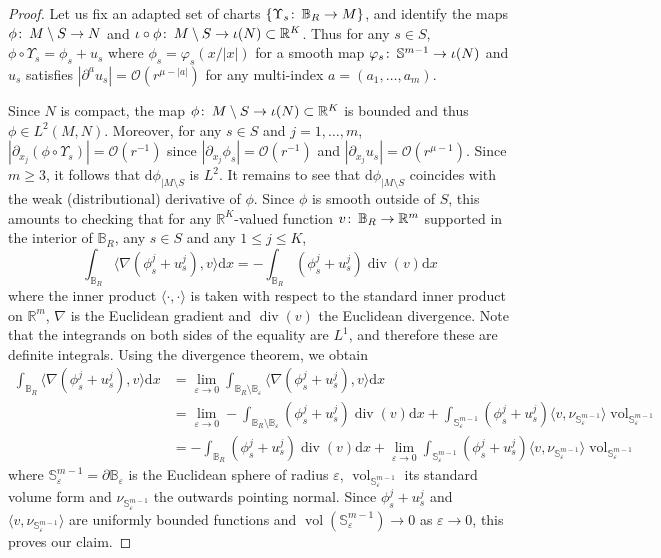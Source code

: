 \documentclass{article}
\numberwithin{equation}{section}        %
\theoremstyle{bfnote}
\theoremstyle{definition}
\theoremstyle{bfremark}
\newcommand{\col}{\colon \thinspace}        %
\newcommand{\R}{\mathbb{R}}                 %
\newcommand{\Ball}{\mathbb{B}}              %
\newcommand{\Sp}{\mathbb{S}}                %
\newcommand{\diff}{\mathrm{d}}                      %
\DeclareMathOperator{\vol}{vol}                 %
\DeclareMathOperator{\divergence}{div}          %
\begin{document}
\begin{proof}
    Let us fix an adapted set of charts $\{\Upsilon_s \col \Ball_R \to M\}$, and identify the maps $\phi \col M \setminus S \to N$ and $\iota \circ \phi \col M \setminus S \to \iota(N) \subset \R^K$. Thus for any $s \in S$, $\phi \circ \Upsilon_s = \phi_s + u_s$ where $\phi_s = \varphi_s(x/|x|)$ for a smooth map $\varphi_s \col \Sp^{m-1} \to \iota(N)$ and $u_s$ satisfies $|\partial^a u_s| = \mathcal{O}(r^{\mu-|a|})$ for any multi-index $a = (a_1,\ldots,a_m)$.
    
    Since $N$ is compact, the map $\phi \col M \setminus S \rightarrow \iota(N) \subset \R^K$ is bounded and thus $\phi \in L^2(M,N)$. Moreover, for any $s \in S$ and $j = 1,\ldots, m$, $|\partial_{x_j}(\phi \circ \Upsilon_s)| = \mathcal{O}(r^{-1})$ since $|\partial_{x_j} \phi_s| = \mathcal{O}(r^{-1})$ and $|\partial_{x_j} u_s | = \mathcal{O}(r^{\mu-1})$. Since $m \geq 3$, it follows that $\diff\phi_{|M \setminus S}$ is $L^2$. It remains to see that $\diff\phi_{|M\setminus S}$ coincides with the weak (distributional) derivative of $\phi$. Since $\phi$ is smooth outside of $S$, this amounts to checking that for any $\R^K$-valued function $v \col \Ball_R \to \R^m$ supported in the interior of $\Ball_R$, any $s \in S$ and any $1 \leq j \leq K$, 
    \begin{equation*}
        \int_{\Ball_R} \langle \nabla(\phi^j_s + u^j_s), v \rangle \diff x = - \int_{\Ball_R}  (\phi^j_s + u^j_s) \divergence(v) \diff x
    \end{equation*}
    where the inner product $\langle \cdot, \cdot \rangle$ is taken with respect to the standard inner product on $\R^m$, $\nabla$ is the Euclidean gradient and $\divergence(v)$ the Euclidean divergence. Note that the integrands on both sides of the equality are $L^1$, and therefore these are definite integrals. Using the divergence theorem, we obtain
    \begin{align*}
        \int_{\Ball_R} \langle \nabla(\phi^j_s + u^j_s), v \rangle \diff x & = \lim_{\varepsilon \rightarrow 0} \int_{\Ball_R \setminus \Ball_\varepsilon} \langle \nabla(\phi^j_s + u^j_s), v \rangle \diff x \\
        & = \lim_{\varepsilon \rightarrow 0} - \int_{\Ball_R \setminus \Ball_\varepsilon}  (\phi^j_s + u^j_s) \divergence(v) \diff x + \int_{\Sp^{m-1}_\varepsilon} (\phi^j_s + u^j_s) \langle v, \nu_{\Sp^{m-1}_\varepsilon} \rangle \vol_{\Sp^{m-1}_\varepsilon} \\
        & = - \int_{\Ball_R}  (\phi^j_s + u^j_s) \divergence(v) \diff x + \lim_{\varepsilon \to 0} \int_{\Sp^{m-1}_\varepsilon} (\phi^j_s + u^j_s) \langle v, \nu_{\Sp^{m-1}_\varepsilon} \rangle \vol_{\Sp^{m-1}_\varepsilon}
    \end{align*}
    where $\Sp^{m-1}_\varepsilon = \partial \Ball_\varepsilon$ is the Euclidean sphere of radius $\varepsilon$, $\vol_{\Sp^{m-1}_\varepsilon}$ its standard volume form and $\nu_{\Sp^{m-1}_\varepsilon}$ the outwards pointing normal. Since $\phi^j_s + u^j_s$ and $\langle v , \nu_{\Sp^{m-1}_\varepsilon} \rangle$ are uniformly bounded functions and $\vol(\Sp^{m-1}_\varepsilon) \to 0$ as $\varepsilon \to 0$, this proves our claim.
\end{proof}
\end{document}
